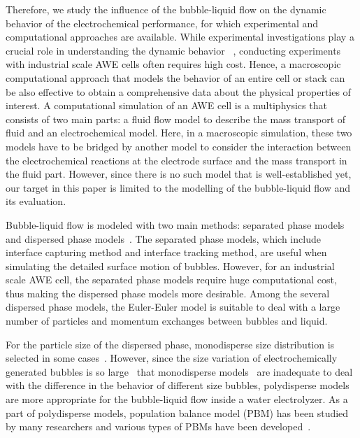 \documentclass[3p, twocolumn, 10pt]{elsarticle}
\begin{document}
Therefore, we study the influence of the bubble-liquid flow on the dynamic behavior of the electrochemical performance, for which experimental and computational approaches are available. 
While experimental investigations play a crucial role in understanding the dynamic behavior~\cite{bakkerGasBubbleRemoval2019}
, conducting experiments with industrial scale AWE cells often requires high cost.
Hence, a macroscopic computational approach that models the behavior of an entire cell or stack can be also effective to obtain a comprehensive data about the physical properties of interest.
A computational simulation of an AWE cell is a multiphysics that consists of two main parts: a fluid flow model to describe the mass transport of fluid and an electrochemical model.
Here, in a macroscopic simulation, these two models have to be bridged by another model to consider the interaction between the electrochemical reactions at the electrode surface and the mass transport in the fluid part. 
However, since there is no such model that is well-established yet, our target in this paper is limited to the modelling of the bubble-liquid flow and its evaluation.

Bubble-liquid flow is modeled with two main methods: separated phase models and dispersed phase models~\cite{COMSOLmsmpf1}.
The separated phase models, which include interface capturing method and interface tracking method, are useful when simulating the detailed surface motion of bubbles.
However, for an industrial scale AWE cell, the separated phase models require huge computational cost, thus making the dispersed phase models more desirable.
Among the several dispersed phase models, the Euler-Euler model is suitable to deal with a large number of particles and momentum exchanges between bubbles and liquid.

For the particle size of the dispersed phase, monodisperse size distribution is selected in some cases~\cite{jupudiModelingBubbleFlow2009, dreoniAccuracyAssessmentEulerian2022, bideauEulerianTwoFluidModel2020}.
However, since the size variation of electrochemically generated bubbles is so large~\cite{ikedaMicroscopicHighspeedVideo2022,wedinExperimentsModellingElectrochemically2003,boissonneauBubbleInducedFree2000}
that monodisperse models~\cite{bideauEulerianTwoFluidModel2020, zarghamiCFDModelingMultiphase2020, alexiadisLiquidgasFlowPatterns2011}
are inadequate to deal with the difference in the behavior of different size bubbles, polydisperse models are more appropriate for the bubble-liquid flow inside a water electrolyzer.
As a part of polydisperse models, population balance model (PBM) has been studied by many researchers and various types of PBMs have been developed~\cite{liQuadraturebasedMomentMethods2019}.
\end{document}

